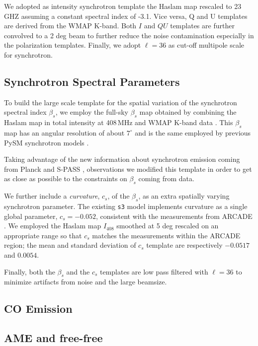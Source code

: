 We  adopted as  intensity synchrotron template the   Haslam map  rescaled to 23 GHZ assuming a constant spectral index of -3.1. Vice versa,  Q and U templates are derived from the WMAP K-band. Both $I$ and $QU$ templates are further convolved to a  2 deg beam to further reduce the noise contamination especially in the polarization templates. Finally, we  adopt $\ell = 36$ as  cut-off multipole scale  for synchrotron.  

\subsection{Synchrotron Spectral Parameters}
To build the large scale template for the spatial variation of the synchrotron spectral index $\beta_s$, we employ the full-sky $\beta_s$ map obtained by combining the Haslam map in total intensity at 408\,MHz \citep{Remazeilles:2014} and WMAP K-band data \citep{mivilledeschenes:2008}. This $\beta_s$ map has an angular resolution of about $7^{\circ}$ and is the same employed by previous PySM synchrotron models \citep{Thorne:2017}. 

Taking advantage of the new information about synchrotron emission coming from Planck and S-PASS \citet{Krachmalnicoff:2018}, observations we modified this template in order to get as close as possible to the constraints on $\beta_s$ coming from data.
 
We further include a \emph{curvature}, $c_s$,  of the  $\beta_s$, as an extra spatially varying synchrotron parameter. The existing \texttt{s3} model  implements curvature as a single global parameter, $c_s = -0.052 $, consistent with the measurements from ARCADE \citep[$c_s=-0.052 \pm 0.005$][]{Kogut:2012}. We employed the Haslam map $I_{408}$ smoothed at 5 deg rescaled on an  appropriate range so that $c_s$ matches the \citet{Kogut:2012} measurements within the ARCADE region; the mean and standard deviation of $c_s$ template are respectively $-0.0517$ and $0.0054$. 

Finally, both the $\beta_s$ and the $c_s$ templates are low pass filtered with $\ell=36$ to minimize artifacts from noise and the large beamsize.

\subsection{CO Emission}

\subsection{AME and free-free}